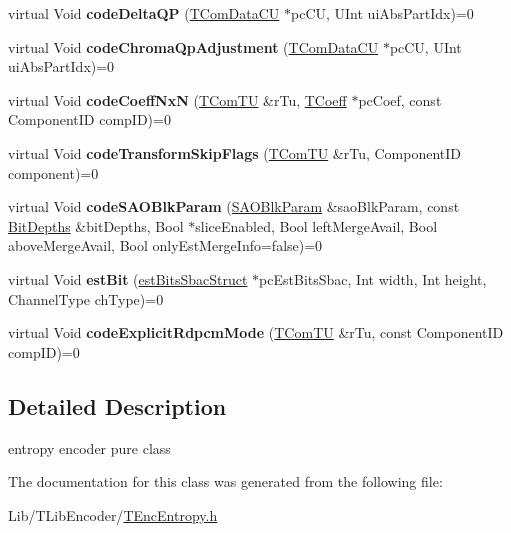 \begin{DoxyCompactItemize}
virtual Void {\bfseries code\+Delta\+QP} (\hyperlink{class_t_com_data_c_u}{T\+Com\+Data\+CU} $\ast$pc\+CU, U\+Int ui\+Abs\+Part\+Idx)=0
\item 
\mbox{\label{class_t_enc_entropy_if_a561086ab8038a6b09429632f135a878b}} 
virtual Void {\bfseries code\+Chroma\+Qp\+Adjustment} (\hyperlink{class_t_com_data_c_u}{T\+Com\+Data\+CU} $\ast$pc\+CU, U\+Int ui\+Abs\+Part\+Idx)=0
\item 
\mbox{\label{class_t_enc_entropy_if_a233bdffd7be3ef05af7fc46809e3161e}} 
virtual Void {\bfseries code\+Coeff\+NxN} (\hyperlink{class_t_com_t_u}{T\+Com\+TU} \&r\+Tu, \hyperlink{_type_def_8h_a5bdd3b17d14ed1978c366d2d958c0300}{T\+Coeff} $\ast$pc\+Coef, const Component\+ID comp\+ID)=0
\item 
\mbox{\label{class_t_enc_entropy_if_a1c30c520a9ea5e2a3fb65e07fc33fa96}} 
virtual Void {\bfseries code\+Transform\+Skip\+Flags} (\hyperlink{class_t_com_t_u}{T\+Com\+TU} \&r\+Tu, Component\+ID component)=0
\item 
\mbox{\label{class_t_enc_entropy_if_a135cc66c5b6475a4c5cf2af34768516c}} 
virtual Void {\bfseries code\+S\+A\+O\+Blk\+Param} (\hyperlink{struct_s_a_o_blk_param}{S\+A\+O\+Blk\+Param} \&sao\+Blk\+Param, const \hyperlink{struct_bit_depths}{Bit\+Depths} \&bit\+Depths, Bool $\ast$slice\+Enabled, Bool left\+Merge\+Avail, Bool above\+Merge\+Avail, Bool only\+Est\+Merge\+Info=false)=0
\item 
\mbox{\label{class_t_enc_entropy_if_af04356f3b72d2cd8c7b09446e0513ac1}} 
virtual Void {\bfseries est\+Bit} (\hyperlink{structest_bits_sbac_struct}{est\+Bits\+Sbac\+Struct} $\ast$pc\+Est\+Bits\+Sbac, Int width, Int height, Channel\+Type ch\+Type)=0
\item 
\mbox{\label{class_t_enc_entropy_if_ad49a1d393b2afa54bb1c3f5607ca2fb3}} 
virtual Void {\bfseries code\+Explicit\+Rdpcm\+Mode} (\hyperlink{class_t_com_t_u}{T\+Com\+TU} \&r\+Tu, const Component\+ID comp\+ID)=0
\end{DoxyCompactItemize}


\subsection{Detailed Description}
entropy encoder pure class 

The documentation for this class was generated from the following file\+:\begin{DoxyCompactItemize}
\item 
Lib/\+T\+Lib\+Encoder/\hyperlink{_t_enc_entropy_8h}{T\+Enc\+Entropy.\+h}\end{DoxyCompactItemize}
